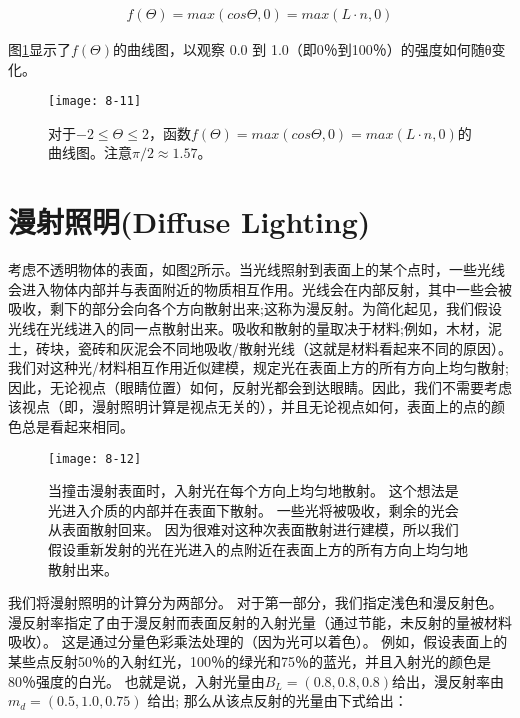 \begin{align*}
f(\Theta)=max(cos\Theta,0)=max(L\cdot n, 0)
\end{align*}

\begin{flushleft}
图\ref{fig:8-11}显示了$f(\Theta)$的曲线图，以观察 0.0 到 1.0（即0％到100％）的强度如何随θ变化。
\end{flushleft}

\begin{figure}[h]
    \label{fig:8-11}
    \texttt{[image: 8-11]}
    \centering
    \caption{对于$-2\leq \Theta \leq 2$，函数$f(\Theta)=max(cos\Theta,0)=max(L\cdot n, 0)$的曲线图。注意$\pi /2 \approx 1.57$。}
\end{figure}

\section{漫射照明(Diffuse Lighting)}
\begin{flushleft}
考虑不透明物体的表面，如图\ref{fig:8-12}所示。当光线照射到表面上的某个点时，一些光线会进入物体内部并与表面附近的物质相互作用。光线会在内部反射，其中一些会被吸收，剩下的部分会向各个方向散射出来;这称为漫反射。为简化起见，我们假设光线在光线进入的同一点散射出来。吸收和散射的量取决于材料;例如，木材，泥土，砖块，瓷砖和灰泥会不同地吸收/散射光线（这就是材料看起来不同的原因）。我们对这种光/材料相互作用近似建模，规定光在表面上方的所有方向上均匀散射;因此，无论视点（眼睛位置）如何，反射光都会到达眼睛。因此，我们不需要考虑该视点（即，漫射照明计算是视点无关的），并且无论视点如何，表面上的点的颜色总是看起来相同。\\
\end{flushleft}

\begin{figure}[h]
    \label{fig:8-12}
    \texttt{[image: 8-12]}
    \centering
    \caption{当撞击漫射表面时，入射光在每个方向上均匀地散射。 这个想法是光进入介质的内部并在表面下散射。 一些光将被吸收，剩余的光会从表面散射回来。 因为很难对这种次表面散射进行建模，所以我们假设重新发射的光在光进入的点附近在表面上方的所有方向上均匀地散射出来。}
\end{figure}

\begin{flushleft}
我们将漫射照明的计算分为两部分。 对于第一部分，我们指定浅色和漫反射色。 漫反射率指定了由于漫反射而表面反射的入射光量（通过节能，未反射的量被材料吸收）。 这是通过分量色彩乘法处理的（因为光可以着色）。 例如，假设表面上的某些点反射50％的入射红光，100％的绿光和75％的蓝光，并且入射光的颜色是80％强度的白光。 也就是说，入射光量由$B_{L}=(0.8,0.8,0.8)$给出，漫反射率由$m_{d}=(0.5,1.0,0.75)$ 给出; 那么从该点反射的光量由下式给出：\\
\end{flushleft}

